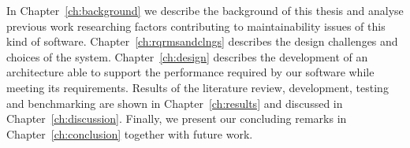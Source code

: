 In Chapter~\ref{ch:background} we describe the background of this thesis and analyse previous work researching factors contributing to maintainability issues of this kind of software. Chapter~\ref{ch:rqrmsandclngs} describes the design challenges and choices of the system. Chapter~\ref{ch:design} describes the development of an architecture able to support the performance required by our software while meeting its requirements. Results of the literature review, development, testing and benchmarking are shown in Chapter~\ref{ch:results} and discussed in Chapter~\ref{ch:discussion}. Finally, we present our concluding remarks in Chapter~\ref{ch:conclusion} together with future work.

